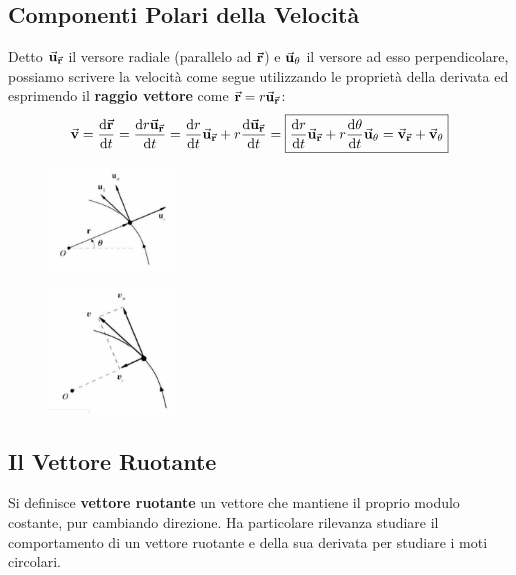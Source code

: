 \documentclass{report}
\renewcommand{\v}{\va{v}}
\renewcommand{\u}{\va{u}}
\renewcommand{\r}{\va{r}}
\begin{document}
\subsection{Componenti Polari della Velocità}
Detto $\u_{\r}$ il versore radiale (parallelo ad $\r$) e $\u_{\theta}$ il versore ad esso perpendicolare, possiamo scrivere la velocità come segue utilizzando le proprietà della derivata ed esprimendo il \textbf{raggio vettore} come $\r=r\u_{\r}$:
\[\v=\dv{\r}{t}=\dv{r\u_{\r}}{t}=\dv{r}{t}\u_{\r}+r\dv{\u_{\r}}{t}=\boxed{\dv{r}{t}\u_{\r}+r\dv{\theta}{t}\u_{\theta}=\v_{\r}+\v_{\theta}}\]
\begin{figure}[H]
    \centering
    \includegraphics[width=0.3\textwidth]{ComponentiPolariVelocit.png}
\end{figure}
\begin{figure}[H]
    \centering
    \includegraphics[width=0.3\textwidth]{CompPolVel.png}
\end{figure}
\subsection{Il Vettore Ruotante}
Si definisce \textbf{vettore ruotante} un vettore che mantiene il proprio modulo costante, pur cambiando direzione. Ha particolare rilevanza studiare il comportamento di un vettore ruotante e della sua derivata per studiare i moti circolari.
\end{document}
